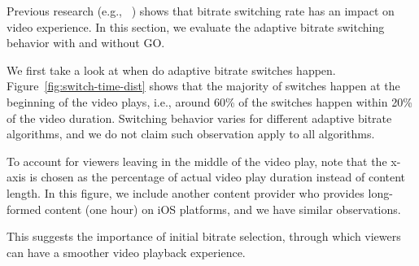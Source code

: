 \begin{figure}[h!]
\centering
{}
\hspace{-0.6cm}
\label{fig:eval-case-study}
\end{figure}




Previous research (e.g., ~\cite{user-adaptive,videoqoe}) shows that bitrate switching rate has an impact on video experience. In this section, we evaluate the adaptive 
bitrate switching behavior with and without GO. 

We first take a look at when do adaptive bitrate switches happen. Figure~\ref{fig:switch-time-dist} shows that the 
majority of switches happen at the beginning of the video plays, i.e., around 60\% of the switches 
happen within 20\% of the video duration. Switching behavior varies for different adaptive bitrate algorithms, and we do not 
claim such observation apply to all algorithms.

To account for viewers leaving in the middle of the video play, note that the x-axis is chosen as the percentage of actual 
video play duration instead of content length. 
In this figure, we include another content provider who provides long-formed content (one hour) on iOS platforms, and we have similar observations.

This suggests the importance of initial bitrate selection, through which viewers can have a smoother video playback experience.

